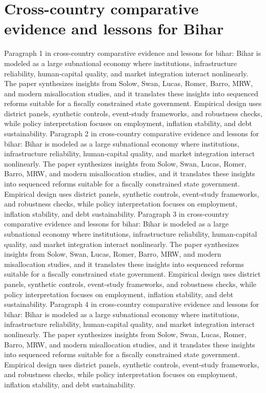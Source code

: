 \documentclass[preprint,12pt]{elsarticle}
\begin{document}
\section{Cross-country comparative evidence and lessons for Bihar}
Paragraph 1 in cross-country comparative evidence and lessons for bihar: Bihar is modeled as a large subnational economy where institutions, infrastructure reliability, human-capital quality, and market integration interact nonlinearly. The paper synthesizes insights from Solow, Swan, Lucas, Romer, Barro, MRW, and modern misallocation studies, and it translates these insights into sequenced reforms suitable for a fiscally constrained state government. Empirical design uses district panels, synthetic controls, event-study frameworks, and robustness checks, while policy interpretation focuses on employment, inflation stability, and debt sustainability.
Paragraph 2 in cross-country comparative evidence and lessons for bihar: Bihar is modeled as a large subnational economy where institutions, infrastructure reliability, human-capital quality, and market integration interact nonlinearly. The paper synthesizes insights from Solow, Swan, Lucas, Romer, Barro, MRW, and modern misallocation studies, and it translates these insights into sequenced reforms suitable for a fiscally constrained state government. Empirical design uses district panels, synthetic controls, event-study frameworks, and robustness checks, while policy interpretation focuses on employment, inflation stability, and debt sustainability.
Paragraph 3 in cross-country comparative evidence and lessons for bihar: Bihar is modeled as a large subnational economy where institutions, infrastructure reliability, human-capital quality, and market integration interact nonlinearly. The paper synthesizes insights from Solow, Swan, Lucas, Romer, Barro, MRW, and modern misallocation studies, and it translates these insights into sequenced reforms suitable for a fiscally constrained state government. Empirical design uses district panels, synthetic controls, event-study frameworks, and robustness checks, while policy interpretation focuses on employment, inflation stability, and debt sustainability.
Paragraph 4 in cross-country comparative evidence and lessons for bihar: Bihar is modeled as a large subnational economy where institutions, infrastructure reliability, human-capital quality, and market integration interact nonlinearly. The paper synthesizes insights from Solow, Swan, Lucas, Romer, Barro, MRW, and modern misallocation studies, and it translates these insights into sequenced reforms suitable for a fiscally constrained state government. Empirical design uses district panels, synthetic controls, event-study frameworks, and robustness checks, while policy interpretation focuses on employment, inflation stability, and debt sustainability.
\end{document}
